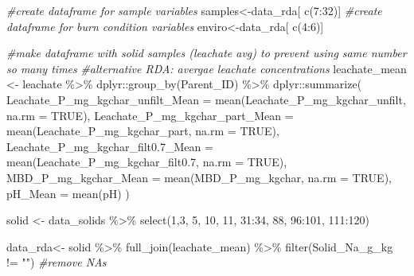 \documentclass[
]{article}
\newenvironment{Shaded}{\begin{snugshade}}{\end{snugshade}}
\newcommand{\AttributeTok}[1]{\textcolor[rgb]{0.77,0.63,0.00}{#1}}
\newcommand{\CommentTok}[1]{\textcolor[rgb]{0.56,0.35,0.01}{\textit{#1}}}
\newcommand{\ConstantTok}[1]{\textcolor[rgb]{0.00,0.00,0.00}{#1}}
\newcommand{\DecValTok}[1]{\textcolor[rgb]{0.00,0.00,0.81}{#1}}
\newcommand{\FloatTok}[1]{\textcolor[rgb]{0.00,0.00,0.81}{#1}}
\newcommand{\FunctionTok}[1]{\textcolor[rgb]{0.00,0.00,0.00}{#1}}
\newcommand{\NormalTok}[1]{#1}
\newcommand{\OtherTok}[1]{\textcolor[rgb]{0.56,0.35,0.01}{#1}}
\newcommand{\SpecialCharTok}[1]{\textcolor[rgb]{0.00,0.00,0.00}{#1}}
\newcommand{\StringTok}[1]{\textcolor[rgb]{0.31,0.60,0.02}{#1}}
\begin{document}
\begin{Shaded}
\begin{Highlighting}[]
\CommentTok{\#create dataframe for sample variables}
\NormalTok{samples}\OtherTok{\textless{}{-}}\NormalTok{data\_rda[ }\FunctionTok{c}\NormalTok{(}\DecValTok{7}\SpecialCharTok{:}\DecValTok{32}\NormalTok{)]}
\CommentTok{\#create dataframe for burn condition variables}
\NormalTok{enviro}\OtherTok{\textless{}{-}}\NormalTok{data\_rda[ }\FunctionTok{c}\NormalTok{(}\DecValTok{4}\SpecialCharTok{:}\DecValTok{6}\NormalTok{)]}

\CommentTok{\#make dataframe with solid samples (leachate avg) to prevent using same number so many times}
\CommentTok{\#alternative RDA: avergae leachate concentrations}
\NormalTok{leachate\_mean }\OtherTok{\textless{}{-}}\NormalTok{ leachate }\SpecialCharTok{\%\textgreater{}\%}
\NormalTok{  dplyr}\SpecialCharTok{::}\FunctionTok{group\_by}\NormalTok{(Parent\_ID) }\SpecialCharTok{\%\textgreater{}\%}
\NormalTok{  dplyr}\SpecialCharTok{::}\FunctionTok{summarize}\NormalTok{(}
    \AttributeTok{Leachate\_P\_mg\_kgchar\_unfilt\_Mean =} \FunctionTok{mean}\NormalTok{(Leachate\_P\_mg\_kgchar\_unfilt, }\AttributeTok{na.rm =} \ConstantTok{TRUE}\NormalTok{),}
    \AttributeTok{Leachate\_P\_mg\_kgchar\_part\_Mean =} \FunctionTok{mean}\NormalTok{(Leachate\_P\_mg\_kgchar\_part, }\AttributeTok{na.rm =} \ConstantTok{TRUE}\NormalTok{),}
    \AttributeTok{Leachate\_P\_mg\_kgchar\_filt0.7\_Mean =} \FunctionTok{mean}\NormalTok{(Leachate\_P\_mg\_kgchar\_filt0}\FloatTok{.7}\NormalTok{, }\AttributeTok{na.rm =} \ConstantTok{TRUE}\NormalTok{),}
    \AttributeTok{MBD\_P\_mg\_kgchar\_Mean =} \FunctionTok{mean}\NormalTok{(MBD\_P\_mg\_kgchar, }\AttributeTok{na.rm =} \ConstantTok{TRUE}\NormalTok{),}
    \AttributeTok{pH\_Mean =} \FunctionTok{mean}\NormalTok{(pH)}
\NormalTok{  )}

\NormalTok{solid }\OtherTok{\textless{}{-}}\NormalTok{ data\_solids }\SpecialCharTok{\%\textgreater{}\%}
  \FunctionTok{select}\NormalTok{(}\DecValTok{1}\NormalTok{,}\DecValTok{3}\NormalTok{, }\DecValTok{5}\NormalTok{, }\DecValTok{10}\NormalTok{, }\DecValTok{11}\NormalTok{, }\DecValTok{31}\SpecialCharTok{:}\DecValTok{34}\NormalTok{, }\DecValTok{88}\NormalTok{, }\DecValTok{96}\SpecialCharTok{:}\DecValTok{101}\NormalTok{, }\DecValTok{111}\SpecialCharTok{:}\DecValTok{120}\NormalTok{)}

\NormalTok{data\_rda}\OtherTok{\textless{}{-}}\NormalTok{ solid }\SpecialCharTok{\%\textgreater{}\%}
  \FunctionTok{full\_join}\NormalTok{(leachate\_mean) }\SpecialCharTok{\%\textgreater{}\%}
  \FunctionTok{filter}\NormalTok{(Solid\_Na\_g\_kg }\SpecialCharTok{!=} \StringTok{""}\NormalTok{) }\CommentTok{\#remove NAs}
\end{Highlighting}
\end{Shaded}
\end{document}
